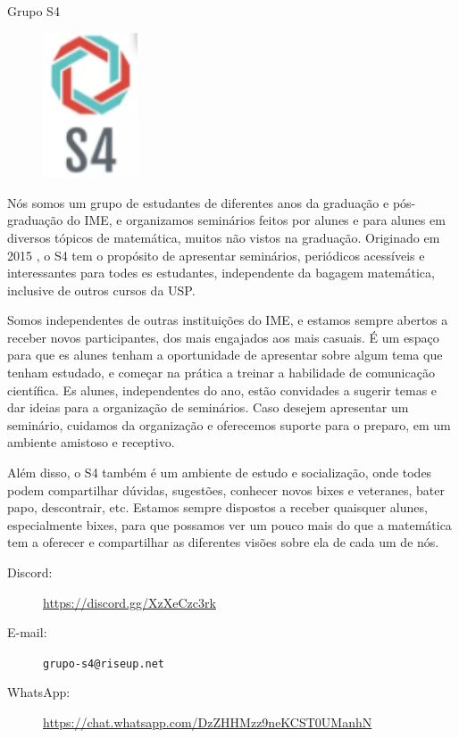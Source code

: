 \begin{subsecao}{Grupo S4}

\begin{figure}
    \vspace{-25pt}
    \begin{center}
      \includegraphics[width=0.25\textwidth]{img/logo S4 maior.png}
    \end{center}
    \vspace{-25pt}
  \end{figure}


Nós somos um grupo de estudantes de diferentes anos da graduação e pós-graduação 
do IME, e organizamos seminários feitos por alunes e para alunes em diversos
tópicos de matemática, muitos não vistos na graduação. Originado em 2015 , o S4 tem
o propósito de apresentar seminários, periódicos acessíveis e interessantes para todes 
es estudantes, independente da bagagem matemática, inclusive de outros cursos da USP. 

Somos independentes de outras instituições do IME, e estamos sempre abertos a 
receber novos participantes, dos mais engajados aos mais casuais. É um espaço
para que es alunes tenham a oportunidade de apresentar sobre algum tema que tenham
estudado, e começar na prática a treinar a habilidade de comunicação científica. 
Es alunes, independentes do ano, estão convidades a sugerir temas e dar ideias
para a organização de seminários. Caso desejem apresentar um seminário, cuidamos 
da organização e oferecemos suporte para o preparo, em um ambiente amistoso e receptivo.

Além disso, o S4 também é um ambiente de estudo e socialização, onde todes podem
compartilhar dúvidas, sugestões, conhecer novos bixes e veteranes, bater papo,
descontrair, etc. Estamos sempre dispostos a receber quaisquer alunes, especialmente
bixes, para que possamos ver um pouco mais do que a matemática tem a oferecer e
compartilhar as diferentes visões sobre ela de cada um de nós.

\begin{description}
  \item[Discord:] \url{https://discord.gg/XzXeCzc3rk}
  \item[E-mail:] {\tt grupo-s4@riseup.net}
  \item[WhatsApp:] \url{https://chat.whatsapp.com/DzZHHMzz9neKCST0UManhN}
\end{description}

\end{subsecao}
